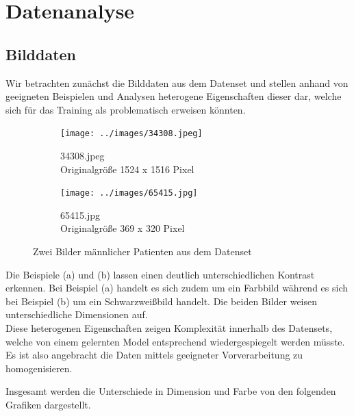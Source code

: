 \chapter{Datenanalyse}
\label{ch:data_analysis}

\section{Bilddaten}
\newlength{\imagewidth}

Wir betrachten zunächst die Bilddaten aus dem Datenset und stellen anhand von geeigneten Beispielen und Analysen heterogene Eigenschaften dieser dar, welche sich für das Training als problematisch erweisen könnten.

\begin{figure}[ht]
	\centering
	\begin{subfigure}[b]{0.45\textwidth}
		\texttt{[image: ../images/34308.jpeg]}
		\caption{34308.jpeg\\Originalgröße 1524 x 1516 Pixel}
	\end{subfigure} \hfill
	\begin{subfigure}[b]{0.45\textwidth}
		\texttt{[image: ../images/65415.jpg]}
		\caption{65415.jpg\\Originalgröße 369 x 320 Pixel}
	\end{subfigure}
	\caption{Zwei Bilder männlicher Patienten aus dem Datenset}
\end{figure}

Die Beispiele (a) und (b) lassen einen deutlich unterschiedlichen Kontrast erkennen. Bei Beispiel (a) handelt es sich zudem um ein Farbbild während es sich bei Beispiel (b) um ein Schwarzweißbild handelt. Die beiden Bilder weisen unterschiedliche Dimensionen auf.\\
Diese heterogenen Eigenschaften zeigen Komplexität innerhalb des Datensets, welche von einem gelernten Model entsprechend wiedergespiegelt werden müsste. Es ist also angebracht die Daten mittels geeigneter Vorverarbeitung zu homogenisieren.

Insgesamt werden die Unterschiede in Dimension und Farbe von den folgenden Grafiken dargestellt.


